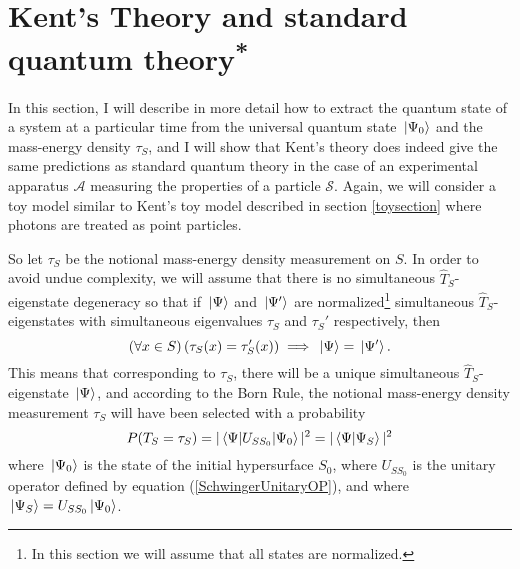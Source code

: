 
\section{Kent's Theory and standard quantum theory\textsuperscript{*}\label{KentconsistentQT}}
In this section, I will describe in more detail how to extract the quantum state of a system at a particular time from the universal quantum state $\ket*{\Psi_0}$ and the mass-energy density $\tau_S$, and I will show that Kent's theory does indeed give the same predictions as standard quantum theory in the case of an experimental apparatus $\mathcal{A}$ measuring the properties of a particle $\mathcal{S}$. Again, we will consider a toy model similar to Kent's toy model described in section \ref{toysection} where photons are treated as point particles.

So let $\tau_S$ be the notional mass-energy density measurement on $S$. In order to avoid undue complexity, we will assume that there is no simultaneous $\hat{T}_S$-eigenstate degeneracy so that if $\ket*{\Psi}$ and $\ket*{\Psi'}$ are normalized\footnote{In this section we will assume that all states are normalized.} simultaneous $\hat{T}_S$-eigenstates with simultaneous eigenvalues $\tau_S$ and $\tau_S'$ respectively, then
$$(\forall x\in S) \,(\tau_S(x)=\tau_S'(x))\implies \ket*{\Psi}=\ket*{\Psi'}.$$
This means that corresponding to $\tau_S$, there will be a unique simultaneous $\hat{T}_S$-eigenstate $\ket*{\Psi}$, and according to the Born Rule, the notional mass-energy density measurement $\tau_S$ will have been selected with a probability 
$$P(T_S = \tau_S)=|\mel{\Psi}{U_{SS_0}}{\Psi_0}|^2=|\ip{\Psi}{\Psi_S}|^2$$
where $\ket*{\Psi_0}$ is the state of the initial hypersurface $S_0$, where $U_{SS_0}$ is the unitary operator defined by equation (\ref{SchwingerUnitaryOP}), and where $\ket*{\Psi_S}=U_{SS_0}\ket*{\Psi_0}$.

